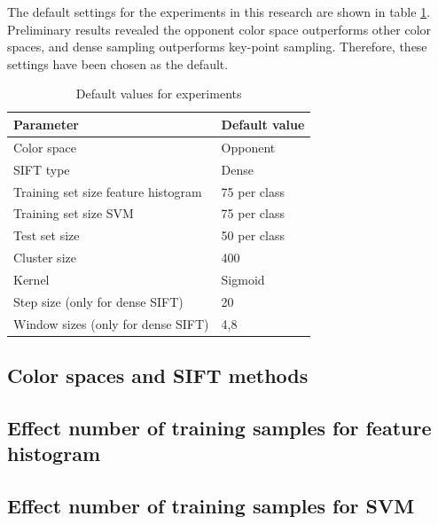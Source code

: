 The default settings for the experiments in this research are shown in table \ref{tab:default}. Preliminary results revealed the opponent color space outperforms other color spaces, and dense sampling outperforms key-point sampling. Therefore, these settings have been chosen as the default.
\begin{table}[H]
\begin{tabular}{|l|l|}
\hline
\textbf{Parameter} & \textbf{Default value}\\
\hline
Color space & Opponent\\
SIFT type & Dense\\
Training set size feature histogram & 75 per class\\
Training set size SVM & 75 per class\\
Test set size & 50 per class \\
Cluster size & 400 \\
Kernel & Sigmoid \\
Step size (only for dense SIFT) & 20\\
Window sizes (only for dense SIFT) & 4,8\\
\hline
\end{tabular}
\caption{Default values for experiments}
\label{tab:default}
\end{table}


\subsection{Color spaces and SIFT methods}


\subsection{Effect number of training samples for feature histogram}


\subsection{Effect number of training samples for SVM}











